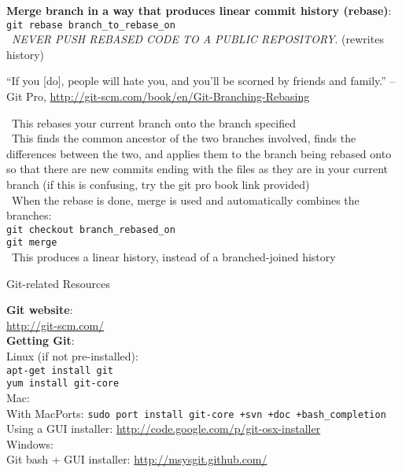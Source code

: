 \documentclass[12pt]{article}
\begin{document}
{\newpage
{\bf Merge branch in a way that produces linear commit history (rebase)}:\\
\texttt{git rebase branch{\_}to{\_}rebase{\_}on}\\
\textbullet\, \emph{NEVER PUSH REBASED CODE TO A PUBLIC REPOSITORY}. (rewrites history)
\begin{quoting}[vskip=0pt]
``If you [do], people will hate you, and you’ll be scorned by friends and family.'' --Git Pro, \url{http://git-scm.com/book/en/Git-Branching-Rebasing}
\end{quoting}
\textbullet\, This rebases your current branch onto the branch specified\\
\textbullet\, This finds the common ancestor of the two branches involved, finds the differences between the two, and applies them to the branch being rebased onto so that there are new commits ending with the files as they are in your current branch (if this is confusing, try the git pro book link provided)\\
\textbullet\, When the rebase is done, merge is used and automatically combines the branches:\\
\hspace*{6mm}\texttt{git checkout branch{\_}rebased{\_}on}\\
\hspace*{6mm}\texttt{git merge}\\
\textbullet\, This produces a linear history, instead of a branched-joined history\\

\newpage
\begin{center}
{\large Git-related Resources}
\end{center}
{\bf Git website}:\\
\url{http://git-scm.com/}\\

{\bf Getting Git}:\\
Linux (if not pre-installed):\\
\texttt{apt-get install git}\\
\texttt{yum install git-core}\\

Mac:\\
With MacPorts: \texttt{sudo port install git-core +svn +doc +bash{\_}completion}\\
Using a GUI installer: \url{http://code.google.com/p/git-osx-installer}\\

Windows:\\
Git bash + GUI installer: \url{http://msysgit.github.com/}\\

}
\end{document}
